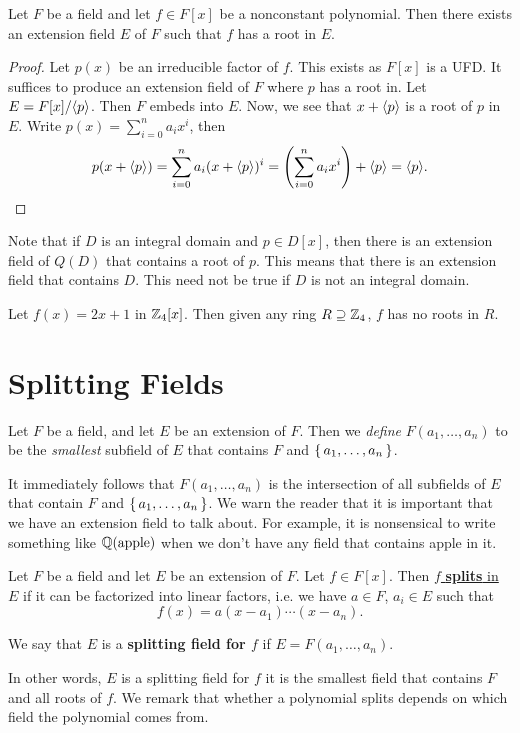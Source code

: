 \documentclass[oneside]{book}
\begin{document}
\begin{theorem}
\label{thm:extension-fields-exist}
    Let $F$ be a field and let $f \in F[x]$ be a nonconstant polynomial. Then
    there exists an extension field $E$ of $F$ such that $f$ has a root in $E$.
\end{theorem}
\begin{proof}
    Let $p(x)$ be an irreducible factor of $f$. This exists as $F[x]$ is a UFD.
    It suffices to produce an extension field of $F$ where $p$ has a root in.
    Let $E = F[x] / { \langle p \rangle }$. Then $F$ embeds into $E$. Now, we see that $x +
    { \langle p \rangle }$ is a root of $p$ in $E$. Write $p(x) = \sum_{i=0}^n a_i x^i$, then 
    \[ 
        p(x + \gen{p}) = \sum_{i=0}^n a_i (x+\gen{p})^i =  \paren{\sum_{i=0}^n a_i x^i} + \gen{p} = \gen{p}.
    \]
\end{proof}

Note that if $D$ is an integral domain and $p \in D[x]$, then there is an
extension field of $Q(D)$ that contains a root of $p$. This means that there is
an extension field that contains $D$. This need not be true if $D$ is not an integral domain. 

\begin{example}
    Let $f(x) = 2x+1$ in $\mathbb{Z}_4[x]$. Then given any ring $R \supseteq \mathbb{Z}_4$,
    $f$ has no roots in $R$. 
\end{example}

\section{Splitting Fields}

\begin{definition}
    Let $F$ be a field, and let $E$ be an extension of $F$. Then we
    \emph{define} $F(a_1, \dots, a_n)$ to be the \emph{smallest} subfield of $E$
    that contains $F$ and $\set{a_1, \dots, a_n}$. 
\end{definition}
It immediately follows that $F(a_1, \dots, a_n)$ is the intersection of all
subfields of $E$ that contain $F$ and $\set{a_1, \dots, a_n}$. We warn the
reader that it is important that we have an extension field to talk about.  For
example, it is nonsensical to write something like $\mathbb{Q}(\text{apple})$ when we
don't have any field that contains apple in it.

\begin{definition}
    Let $F$ be a field and let $E$ be an extension of $F$. Let $f \in F[x]$.
    Then \underline{$f$ \textbf{splits} in $E$} if it can be factorized into linear
    factors, i.e. we have $a \in F$, $a_i \in E$ such that 
    \[
        f(x) = a(x - a_1) \cdots (x-a_n).
    \]

    We say that $E$ is a \textbf{splitting field for $f$} if $E = F(a_1, \dots, a_n)$.
\end{definition}
In other words, $E$ is a splitting field for $f$ it is the smallest field that
contains $F$ and all roots of $f$. We remark that whether a polynomial splits
depends on which field the polynomial comes from.
\end{document}
